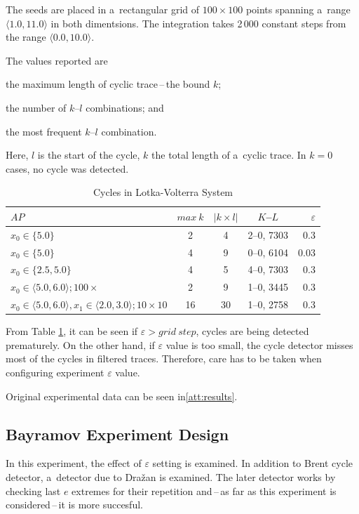 \documentclass[12pt,twoside,draft]{fithesis}
\begin{document}
The seeds are placed in a~rectangular grid of $100\times 100$ points
spanning a~range $\langle 1.0, 11.0\rangle$ in both dimentsions. The
integration takes 2\,000 constant steps from the range $\langle 0.0,
10.0\rangle$.

The values reported are
\begin{inparaenum}
\item the maximum length of cyclic trace\,--\,the bound $k$;
\item the number of $k$--$l$ combinations; and
\item the most frequent $k$--$l$ combination.
\end{inparaenum}

Here, $l$ is the start of the cycle, $k$ the total length of a~cyclic
trace. In $k=0$ cases, no cycle was detected.
\begin{table}[h]
\label{tab:lv}
\begin{tabular}{p{4cm}|c c c r}
$AP$ &$max\:k$ &$|k\times l|$ &$K$--$L$ &$\varepsilon$\\
\hline
$x_0\in\{5.0\}$
	&2
	&4
	&2--0, 7303
	&0.3\\
$x_0\in\{5.0\}$
	&4
	&9
	&0--0, 6104
	&0.03\\
$x_0\in\{2.5,5.0\}$
	&4
	&5
	&4--0, 7303
	&0.3\\
$x_0\in\langle 5.0,6.0\rangle;100\times$
	&2
	&9
	&1--0, 3445
	&0.3\\
$x_0\in\langle 5.0,6.0\rangle, x_1\in\langle 2.0,3.0\rangle;10\times 10$
	&16
	&30
	&1--0, 2758
	&0.3\\
\end{tabular}
\caption{Cycles in Lotka-Volterra System}
\end{table}

From Table \ref{tab:lv}, it can be seen if $\varepsilon>grid\:step$,
cycles are being detected prematurely. On the other hand,
if $\varepsilon$ value is too small, the cycle detector misses most of
the cycles in filtered traces. Therefore, care has to be taken
when configuring experiment $\varepsilon$ value.

Original experimental data can be seen in\ref{att:results}.




\subsection*{Bayramov Experiment Design}
In this experiment, the effect of $\varepsilon$ setting is examined. In
addition to Brent cycle detector, a~detector due to Dra\v{z}an
\cite{sven} is examined. The later detector works by checking last $e$
extremes for their repetition and\,--\,as far as this experiment is
considered\,--\,it is more succesful.
\end{document}
